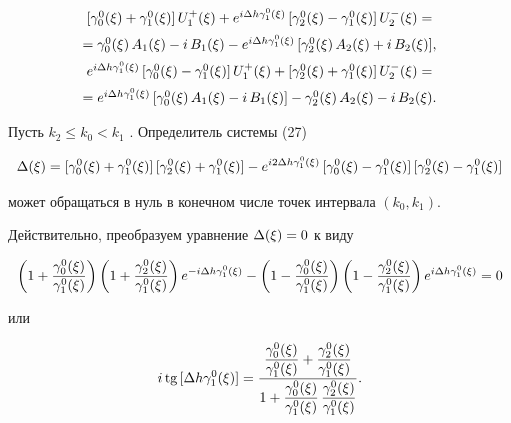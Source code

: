 \begin{equation}


\begin{array}{c}


[\gaoxi{0}+\gaoxi{1}]\,U^+_1(\xi) +


e^{i\De h\gaoxi{1}}\,[\gaoxi{2}-\gaoxi{1}]\,U^-_2(\xi) = \\[2mm]


%


= \gaoxi{0}\,A_1(\xi)-i\,B_1(\xi)


- e^{i\De h\gaoxi{1}}\,[\gaoxi{2}\,A_2(\xi)+i\,B_2(\xi)] , \\[2mm]


%


e^{i\De h\gaoxi{1}}\,[\gaoxi{0}-\gaoxi{1}]\,U^+_1(\xi) +


[\gaoxi{2}+\gaoxi{1}]\,U^-_2(\xi) = \\[2mm]


%


= e^{i\De h\gaoxi{1}}\,[\gaoxi{0}\,A_1(\xi)-i\,B_1(\xi)]


-\gaoxi{2}\,A_2(\xi)-i\,B_2(\xi) . 


\end{array}


\end{equation}





Пусть $k_2\le k_0 < k_1$ . Определитель системы (27)


$$


\De(\xi) = [\gaoxi{0}+\gaoxi{1}]\,[\gaoxi{2}+\gaoxi{1}]


 - e^{i2\De h\gaoxi{1}}\,[\gaoxi{0}-\gaoxi{1}]\,[\gaoxi{2}-\gaoxi{1}]


$$


может обращаться в нуль в конечном числе точек интервала $(k_0,k_1)$.


Действительно, преобразуем уравнение $\Delta(\xi)=0$ к виду


$$


\bigg( 1+\frac{\gaoxi{0}}{\gaoxi{1}} \bigg)\,


\bigg( 1+\frac{\gaoxi{2}}{\gaoxi{1}} \bigg)\,e^{-i\De h\gaoxi{1}}


- \bigg( 1-\frac{\gaoxi{0}}{\gaoxi{1}} \bigg)\,


\bigg( 1-\frac{\gaoxi{2}}{\gaoxi{1}} \bigg)\,e^{i\De h\gaoxi{1}} = 0


$$


или


\begin{equation}


i\,\text{tg}\,[\De h\gaoxi{1}] =


\frac{\displaystyle \frac{\gaoxi{0}}{\gaoxi{1}}


+ \frac{\gaoxi{2}}{\gaoxi{1}} }


{\displaystyle 1 + \frac{\gaoxi{0}}{\gaoxi{1}}\,


\frac{\gaoxi{2}}{\gaoxi{1}} } .


\end{equation}





